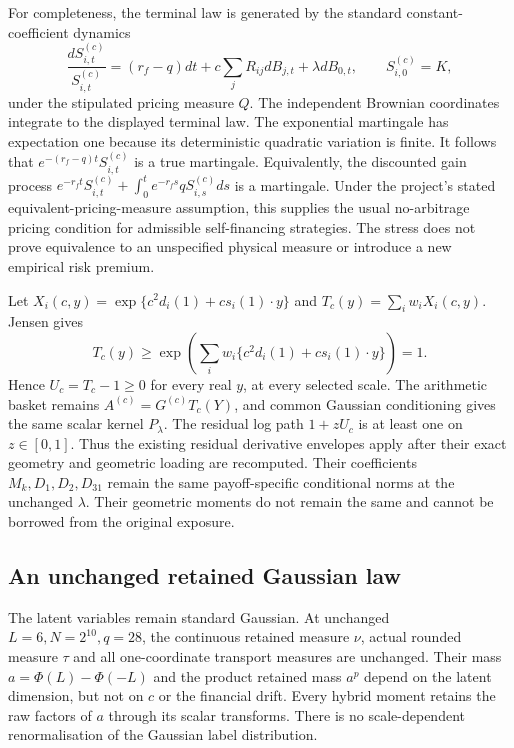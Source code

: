 For completeness, the terminal law is generated by the standard
constant-coefficient dynamics
\[
 \frac{dS_{i,t}^{(c)}}{S_{i,t}^{(c)}}=
 (r_f-q)dt+c\sum_jR_{ij}dB_{j,t}+\lambda dB_{0,t},
 \qquad S_{i,0}^{(c)}=K,
\]
under the stipulated pricing measure $Q$. The independent Brownian
coordinates integrate to the displayed terminal law. The exponential
martingale has expectation one because its deterministic quadratic
variation is finite. It follows that $e^{-(r_f-q)t}S_{i,t}^{(c)}$ is
a true martingale. Equivalently, the discounted gain process
$e^{-r_ft}S_{i,t}^{(c)}+\int_0^t e^{-r_fs}qS_{i,s}^{(c)}ds$ is a
martingale. Under the project's stated equivalent-pricing-measure
assumption, this supplies the usual no-arbitrage pricing condition for
admissible self-financing strategies. The stress does not prove
equivalence to an unspecified physical measure or introduce a new
empirical risk premium.

Let $X_i(c,y)=\exp\{c^2d_i(1)+cs_i(1)\cdot y\}$ and
$T_c(y)=\sum_iw_iX_i(c,y)$. Jensen gives
\[
 T_c(y)\geq\exp\!\left(\sum_iw_i\{c^2d_i(1)+cs_i(1)\cdot y\}\right)=1.
\]
Hence $U_c=T_c-1\geq0$ for every real $y$, at every selected scale.
The arithmetic basket remains $A^{(c)}=G^{(c)}T_c(Y)$, and common
Gaussian conditioning gives the same scalar kernel $P_\lambda$.
The residual log path $1+zU_c$ is at least one on $z\in[0,1]$.
Thus the existing residual derivative envelopes apply after their exact
geometry and geometric loading are recomputed. Their coefficients
$M_k,D_1,D_2,D_{31}$ remain the same payoff-specific conditional
norms at the unchanged $\lambda$. Their geometric moments do not remain
the same and cannot be borrowed from the original exposure.

\subsection{An unchanged retained Gaussian law}

The latent variables remain standard Gaussian. At unchanged
$L=6,N=2^{10},q=28$, the continuous retained measure $\nu$, actual
rounded measure $\tau$ and all one-coordinate transport measures are
unchanged. Their mass $a=\Phi(L)-\Phi(-L)$ and the product retained
mass $a^p$ depend on the latent dimension, but not on $c$ or the financial
drift. Every hybrid moment retains the raw factors of $a$ through its
scalar transforms. There is no scale-dependent renormalisation of the
Gaussian label distribution.

